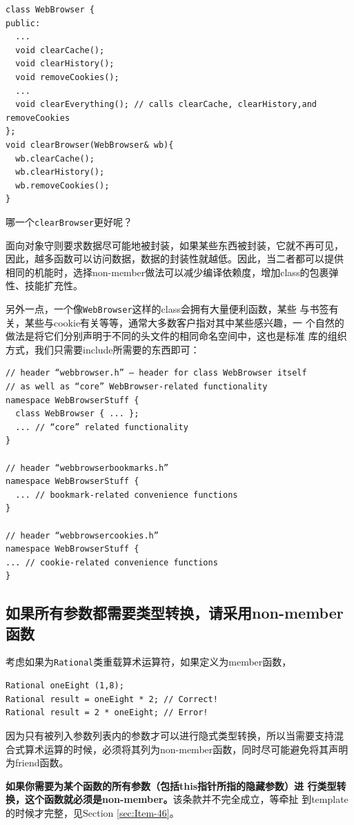 \begin{verbatim}
class WebBrowser {
public:
  ...
  void clearCache();
  void clearHistory();
  void removeCookies();
  ...
  void clearEverything(); // calls clearCache, clearHistory,and removeCookies
};
void clearBrowser(WebBrowser& wb){
  wb.clearCache();
  wb.clearHistory();
  wb.removeCookies();
}
\end{verbatim}
哪一个\texttt{clearBrowser}更好呢？

面向对象守则要求数据尽可能地被封装，如果某些东西被封装，它就不再可见，
因此，越多函数可以访问数据，数据的封装性就越低。因此，当二者都可以提供
相同的机能时，选择non-member做法可以减少编译依赖度，增加class的包裹弹
性、技能扩充性。

另外一点，一个像\texttt{WebBrowser}这样的class会拥有大量便利函数，某些
与书签有关，某些与cookie有关等等，通常大多数客户指对其中某些感兴趣，一
个自然的做法是将它们分别声明于不同的头文件的相同命名空间中，这也是标准
库的组织方式，我们只需要include所需要的东西即可：
\begin{verbatim}
// header “webbrowser.h” — header for class WebBrowser itself 
// as well as “core” WebBrowser-related functionality
namespace WebBrowserStuff {
  class WebBrowser { ... };
  ... // “core” related functionality
}

// header “webbrowserbookmarks.h”
namespace WebBrowserStuff {
  ... // bookmark-related convenience functions
} 

// header “webbrowsercookies.h”
namespace WebBrowserStuff {
... // cookie-related convenience functions
}
\end{verbatim}

\subsection{如果所有参数都需要类型转换，请采用non-member函数}
\label{sec:Item-24}

考虑如果为\texttt{Rational}类重载算术运算符，如果定义为member函数，
\begin{verbatim}
Rational oneEight (1,8);
Rational result = oneEight * 2; // Correct!
Rational result = 2 * oneEight; // Error!
\end{verbatim}
因为只有被列入参数列表内的参数才可以进行隐式类型转换，所以当需要支持混
合式算术运算的时候，必须将其列为non-member函数，同时尽可能避免将其声明
为friend函数。

\textbf{如果你需要为某个函数的所有参数（包括this指针所指的隐藏参数）进
  行类型转换，这个函数就必须是non-member。}该条款并不完全成立，等牵扯
到template的时候才完整，见Section \ref{sec:Item-46}。

